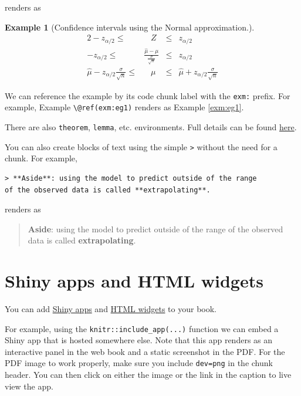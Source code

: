 \documentclass[
  oneside]{krantz}
\theoremstyle{definition}
\theoremstyle{definition}
\newtheorem{example}{Example}[chapter]
\theoremstyle{definition}
\theoremstyle{remark}
\begin{document}
renders as

\begin{example}[Confidence intervals using the Normal approximation.]
\protect\hypertarget{exm:eg1}{}{\label{exm:eg1} {} }\begin{alignat*}{2}
-z_{\alpha/2} \leq{} & \;\;\;Z & \leq{} & z_{\alpha/2} \\
-z_{\alpha/2} \leq{} & \frac{\hat{\mu}-\mu}{\frac{\sigma}{\sqrt{n}}} & \leq{} & z_{\alpha/2}\\
\hat{\mu} - z_{\alpha/2}\frac{\sigma}{\sqrt{n}} \leq{} & \;\;\;\mu & \leq{} & \hat{\mu} + z_{\alpha/2}\frac{\sigma}{\sqrt{n}}
\end{alignat*}
\end{example}

We can reference the example by its code chunk label with the \texttt{exm:} prefix. For example, Example \texttt{\textbackslash{}@ref(exm:eg1)} renders as Example \ref{exm:eg1}.

There are also \texttt{theorem}, \texttt{lemma}, etc. environments. Full details can be found \href{https://bookdown.org/yihui/bookdown/markdown-extensions-by-bookdown.html}{here}.

You can also create blocks of text using the simple \texttt{\textgreater{}} without the need for a chunk. For example,

\begin{verbatim}
> **Aside**: using the model to predict outside of the range 
of the observed data is called **extrapolating**.
\end{verbatim}

renders as

\begin{quote}
\textbf{Aside}: using the model to predict outside of the range of the observed data is called \textbf{extrapolating}.
\end{quote}

\hypertarget{shiny-apps-and-html-widgets}{%
\section{Shiny apps and HTML widgets}\label{shiny-apps-and-html-widgets}}

You can add \href{https://bookdown.org/yihui/bookdown/web-pages-and-shiny-apps.html}{Shiny apps} and \href{https://bookdown.org/yihui/bookdown/html-widgets.html}{HTML widgets} to your book.

For example, using the \texttt{knitr::include\_app(...)} function we can embed a Shiny app that is hosted somewhere else.
Note that this app renders as an interactive panel in the web book and a static screenshot in the PDF. For the PDF image to work properly, make sure you include \texttt{dev=\textquotesingle{}png\textquotesingle{}} in the chunk header. You can then click on either the image or the link in the caption to live view the app.
\end{document}
